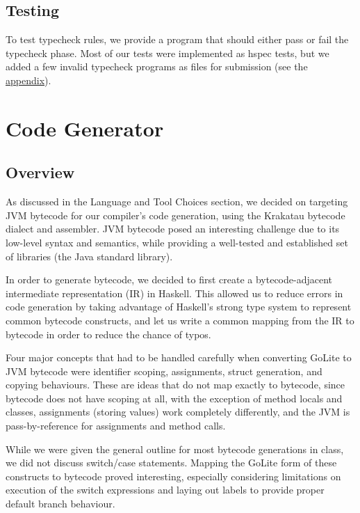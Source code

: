\documentclass[11pt]{article}
\begin{document}
\subsection{Testing}

To test typecheck rules, we provide a program that should either pass
or fail the typecheck phase. Most of our tests were implemented as
hspec tests, but we added a few invalid typecheck programs as files
for submission (see the \hyperref[sec:atypecheck]{appendix}).

\section{Code Generator}
\subsection{Overview}

As discussed in the Language and Tool Choices section, we decided on targeting
JVM bytecode for our compiler's code generation, using the Krakatau bytecode
dialect and assembler. JVM bytecode posed an interesting challenge due to its
low-level syntax and semantics, while providing a well-tested and established
set of libraries (the Java standard library).

In order to generate bytecode, we decided to first create a bytecode-adjacent
intermediate representation (IR) in Haskell. This allowed us to reduce errors
in code generation by taking advantage of Haskell's strong type system to
represent common bytecode constructs, and let us write a common mapping from
the IR to bytecode in order to reduce the chance of typos.

Four major concepts that had to be handled carefully when converting GoLite to
JVM bytecode were identifier scoping, assignments, struct generation, and copying
behaviours. These are ideas that do not map exactly to bytecode, since bytecode
does not have scoping at all, with the exception of method locals and classes,
assignments (storing values) work completely differently, and the JVM is
pass-by-reference for assignments and method calls.

While we were given the general outline for most bytecode generations in class, we
did not discuss switch/case statements. Mapping the GoLite form of these constructs
to bytecode proved interesting, especially considering limitations on execution of
the switch expressions and laying out labels to provide proper default branch behaviour.
\end{document}
